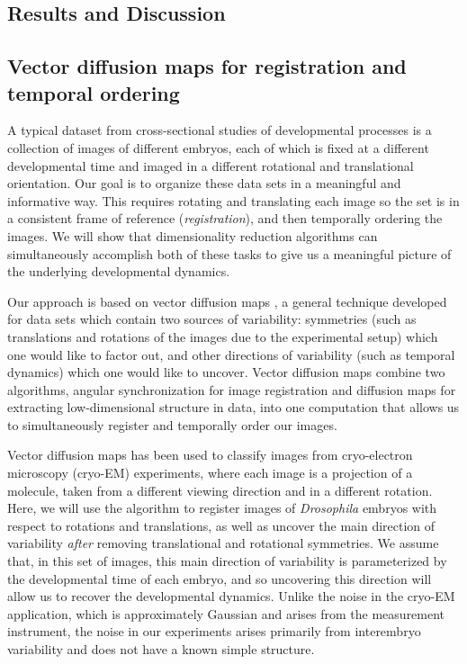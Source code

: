 \documentclass{pnastwo}
\begin{document}
\begin{article}
\section{Results and Discussion}

\subsection{Vector diffusion maps for registration and temporal ordering}

A typical dataset from cross-sectional studies of developmental processes is a collection of images of different embryos, each of which is fixed at a different developmental time and imaged in a different rotational and translational orientation.
%
Our goal is to organize these data sets in a meaningful and informative way.
%
This requires rotating and translating each image so the set is in a consistent frame of reference ({\it registration}), and then temporally ordering the images. 
%
We will show that dimensionality reduction algorithms can simultaneously accomplish both of these tasks to give us a meaningful picture of the underlying developmental dynamics. 

Our approach is based on vector diffusion maps \cite{singer2012vector}, a general technique developed for data sets which contain two sources of variability:
symmetries (such as translations and rotations of the images due to the experimental setup) which one would like to factor out, and other directions of variability (such as temporal dynamics) which one would like to uncover.
%
Vector diffusion maps combine two algorithms, angular synchronization \cite{singer2011angular} for image registration and diffusion maps \cite{coifman2005geometric} for extracting low-dimensional structure in data, into one computation that allows us to simultaneously register and temporally order our images. 
%

Vector diffusion maps has been used to classify images from cryo-electron microscopy (cryo-EM) experiments, where each image is a projection of a molecule, taken from a different viewing direction and in a different rotation. 
%
Here, we will use the algorithm to register images of {\it Drosophila} embryos with respect to rotations and translations, as well as uncover the main direction of variability {\it after} removing translational and rotational symmetries.
%
We assume that, in this set of images, this main direction of variability is parameterized by the developmental time of each embryo, and so uncovering this direction will allow us to recover the developmental dynamics. 
%
Unlike the noise in the cryo-EM application, which is approximately Gaussian and arises from the measurement instrument, the noise in our experiments arises primarily from interembryo variability and does not have a known simple structure.


\end{article}
\end{document}
